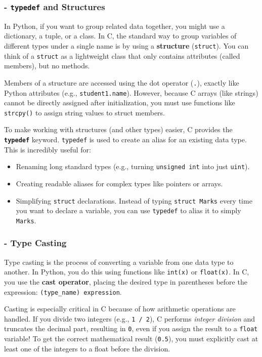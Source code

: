 \subsubsection{- \texttt{typedef} and Structures}

In Python, if you want to group related data together, you might use a dictionary, a tuple, or a class. In C, the standard way to group variables of different types under a single name is by using a \textbf{structure} (\texttt{struct}). You can think of a \texttt{struct} as a lightweight class that only contains attributes (called members), but no methods. 

Members of a structure are accessed using the dot operator (\texttt{.}), exactly like Python attributes (e.g., \texttt{student1.name}). However, because C arrays (like strings) cannot be directly assigned after initialization, you must use functions like \texttt{strcpy()} to assign string values to struct members.

To make working with structures (and other types) easier, C provides the \textbf{\texttt{typedef}} keyword. \texttt{typedef} is used to create an alias for an existing data type. This is incredibly useful for:
\begin{itemize}
    \item[-] Renaming long standard types (e.g., turning \texttt{unsigned int} into just \texttt{uint}).
    \item[-] Creating readable aliases for complex types like pointers or arrays.
    \item[-] Simplifying \texttt{struct} declarations. Instead of typing \texttt{struct Marks} every time you want to declare a variable, you can use \texttt{typedef} to alias it to simply \texttt{Marks}.
\end{itemize}



\subsubsection{- Type Casting}

Type casting is the process of converting a variable from one data type to another. In Python, you do this using functions like \texttt{int(x)} or \texttt{float(x)}. In C, you use the \textbf{cast operator}, placing the desired type in parentheses before the expression: \texttt{(type\_name) expression}.

Casting is especially critical in C because of how arithmetic operations are handled. If you divide two integers (e.g., \texttt{1 / 2}), C performs \textit{integer division} and truncates the decimal part, resulting in \texttt{0}, even if you assign the result to a \texttt{float} variable! To get the correct mathematical result (\texttt{0.5}), you must explicitly cast at least one of the integers to a float before the division.

